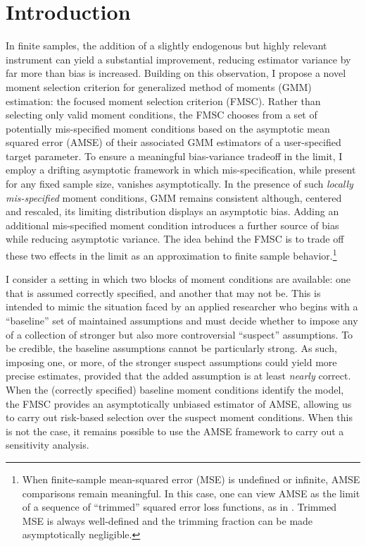 \section{Introduction}
In finite samples, the addition of a slightly endogenous but highly relevant instrument can yield a substantial improvement, reducing estimator variance by far more than bias is increased. 
Building on this observation, I propose a novel moment selection criterion for generalized method of moments (GMM) estimation: the focused moment selection criterion (FMSC). 
Rather than selecting only valid moment conditions, the FMSC chooses from a set of potentially mis-specified moment conditions based on the asymptotic mean squared error (AMSE) of their associated GMM estimators of a user-specified target parameter.
To ensure a meaningful bias-variance tradeoff in the limit, I employ a drifting asymptotic framework in which mis-specification, while present for any fixed sample size, vanishes asymptotically.
In the presence of such \emph{locally mis-specified} moment conditions, GMM remains consistent although, centered and rescaled, its limiting distribution displays an asymptotic bias. Adding an additional mis-specified moment condition introduces a further source of bias while reducing asymptotic variance. 
The idea behind the FMSC is to trade off these two effects in the limit as an approximation to finite sample behavior.\footnote{When finite-sample mean-squared error (MSE) is undefined or infinite, AMSE comparisons remain meaningful. In this case, one can view AMSE as the limit of a sequence of ``trimmed'' squared error loss functions, as in \cite{Hansen2013}. Trimmed MSE is always well-defined and the trimming fraction can be made asymptotically negligible.}
 
I consider a setting in which two blocks of moment conditions are available: one that is assumed correctly specified, and another that may not be.
This is intended to mimic the situation faced by an applied researcher who begins with a ``baseline'' set of maintained assumptions and must decide whether to impose any of a collection of stronger but also more controversial ``suspect'' assumptions.
To be credible, the baseline assumptions cannot be particularly strong.
As such, imposing one, or more, of the stronger suspect assumptions could yield more precise estimates, provided that the added assumption is at least \emph{nearly} correct.
When the (correctly specified) baseline moment conditions identify the model, the FMSC provides an asymptotically unbiased estimator of AMSE, allowing us to carry out risk-based selection over the suspect moment conditions.
When this is not the case, it remains possible to use the AMSE framework to carry out a sensitivity analysis. 

